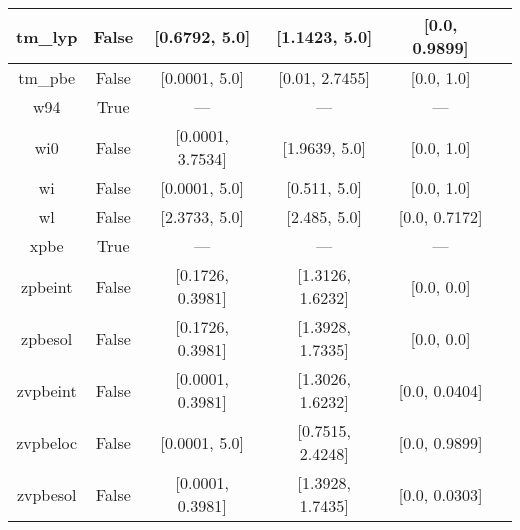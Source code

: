 \begin{tabular}{|c|c|c|c|c|l|}
       tm\_lyp &                 False &    [0.6792, 5.0] &    [1.1423, 5.0] &    [0.0, 0.9899] &                                      \cite{Thakkar2009_134109} \\ \hline
       tm\_pbe &                 False &    [0.0001, 5.0] &   [0.01, 2.7455] &       [0.0, 1.0] &                                      \cite{Thakkar2009_134109} \\ \hline
           w94 &                  True &              --- &              --- &              --- &                                          \cite{Wilson1994_337} \\ \hline
           wi0 &                 False & [0.0001, 3.7534] &    [1.9639, 5.0] &       [0.0, 1.0] &                                          \cite{Wilson1998_523} \\ \hline
            wi &                 False &    [0.0001, 5.0] &     [0.511, 5.0] &       [0.0, 1.0] &                                          \cite{Wilson1998_523} \\ \hline
            wl &                 False &    [2.3733, 5.0] &     [2.485, 5.0] &    [0.0, 0.7172] &                                        \cite{Wilson1990_12930} \\ \hline
          xpbe &                  True &              --- &              --- &              --- &                                             \cite{Xu2004_4068} \\ \hline
       zpbeint &                 False & [0.1726, 0.3981] & [1.3126, 1.6232] &       [0.0, 0.0] &                                   \cite{Constantin2011_233103} \\ \hline
       zpbesol &                 False & [0.1726, 0.3981] & [1.3928, 1.7335] &       [0.0, 0.0] &                                   \cite{Constantin2011_233103} \\ \hline
      zvpbeint &                 False & [0.0001, 0.3981] & [1.3026, 1.6232] &    [0.0, 0.0404] &                                   \cite{Constantin2012_194105} \\ \hline
      zvpbeloc &                 False &    [0.0001, 5.0] & [0.7515, 2.4248] &    [0.0, 0.9899] &                                         \cite{Fabiano2015_122} \\ \hline
      zvpbesol &                 False & [0.0001, 0.3981] & [1.3928, 1.7435] &    [0.0, 0.0303] &                                   \cite{Constantin2012_194105} \\ \hline
\end{tabular}